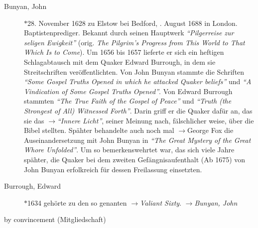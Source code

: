 \begin{description}
 \item[Bunyan, John] $\ast$28. November 1628 zu Elstow bei Bedford, . August 1688 in London. Baptistenprediger. Bekannt durch seinen Hauptwerk \textit{"`Pilgerreise zur seligen Ewigkeit"'} (orig. \textit{The Pilgrim’s Progress from This World to That Which Is to Come}). Um 1656 bis 1657 lieferte er sich ein heftigen Schlagabtausch mit dem Quaker Edward Burrough, in dem sie Streitschriften veröffentlichten. Von John Bunyan stammte die Schriften \textit{"`Some Gospel Truths Opened in which he attacked Quaker beliefs"'} und \textit{"`A Vindication of Some Gospel Truths Opened"'}. Von Edward Burrough stammten \textit{"`The True Faith of the Gospel of Peace"'} und \textit{"`Truth (the Strongest of All) Witnessed Forth"'}. Darin griff er die Quaker dafür an, das sie das $\to$\textit{"`Innere Licht"'}, seiner Meinung nach, fälschlicher weise, über die Bibel stellten. Spähter behandelte auch noch mal $\to$George Fox die Auseinandersetzung mit John Bunyan in \textit{"`The Great Mystery of the Great Whore Unfolded"'}. Um so bemerkenswehrtet war, das sich viele Jahre spähter, die Quaker bei dem zweiten Gefängnisaufenthalt (Ab 1675) von John Bunyan erfolkreich für dessen Freilassung einsetzten.

 \item[Burrough, Edward] $\ast$1634  gehörte zu den so genanten $\to$\textit{Valiant Sixty}. $\to$\textit{Bunyan, John}
 \item[by convincement (Mitgliedschaft)]
 \end{description}

\normalsize

